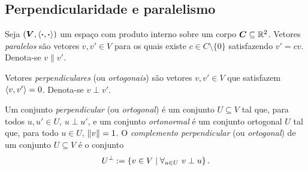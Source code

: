 \begin{comment}
\item (Positividade) Seja $v \in V$. Segue da positividade da norma que
	\begin{equation*}
		\inte{v}{v} = \nor{v}^2 \geq 0.
	\end{equation*}

\item (Definição positiva) Seja $v \in V$ tal que $\inte{v}{v}=0$. Então
	\begin{equation*}
		0 = \inte{v}{v} = \nor{v}^2,
	\end{equation*}
e segue da separação da norma que $v=0$.
\end{enumerate}

Consideremos agora o caso complexo. Definimos
	\begin{align*}
	\inte{v}{v'} &:= \frac{1}{4} \sum_{k=0}^{3} \nor{v+\ii^kv'}^2 \ii^k \\
		&= \frac{\left(\nor{v+v'}^2 - \nor{v-v'}^2\right) + \left(\nor{v+\ii v'}^2 - \nor{v-\ii v'}^2\right) \ii}{4}.
	\end{align*}

A demonstração fica como exercício\footnote{Os detalhes podem ser conferidos em \href{https://math.stackexchange.com/questions/21792/norms-induced-by-inner-products-and-the-parallelogram-law}{https://math.stackexchange.com/questions/21792/norms-induced-by-inner-products-and-the-parallelogram-law}}.
\end{proof}

\end{comment}


\subsection{Perpendicularidade e paralelismo}

\begin{definition}
Seja $(\bm V,\left\langle{\bm{\cdot}},{\bm{\cdot}}\right\rangle)$ um espaço com produto interno sobre um corpo $\bm C \subseteq \mathbb{R}^2$. Vetores \emph{paralelos} são vetores $v,v' \in V$ para os quais existe $c \in C \setminus \{0\}$ satisfazendo $v'=cv$. Denota-se $v \parallel v'$.

Vetores \emph{perpendiculares} (ou \emph{ortogonais}) são vetores $v,v' \in V$ que satisfazem $\left\langle{v},{v'}\right\rangle=0$. Denota-se $v \perp v'$.

Um conjunto \emph{perpendicular} (ou \emph{ortogonal}) é um conjunto $U \subseteq V$ tal que, para todos $u,u' \in U$, $u \perp u'$, e um conjunto \emph{ortonormal} é um conjunto ortogonal $U$ tal que, para todo $u \in U$, $\left\Vert{v}\right\Vert=1$. O \emph{complemento perpendicular} (ou \emph{ortogonal}) de um conjunto $U \subseteq V$ é o conjunto
	\begin{equation*}
	U^\perp := \left\{{v \in V}\;\middle\vert\;{\forall_{u \in U}\ v \perp u}\right\}.
	\end{equation*}
\end{definition}

